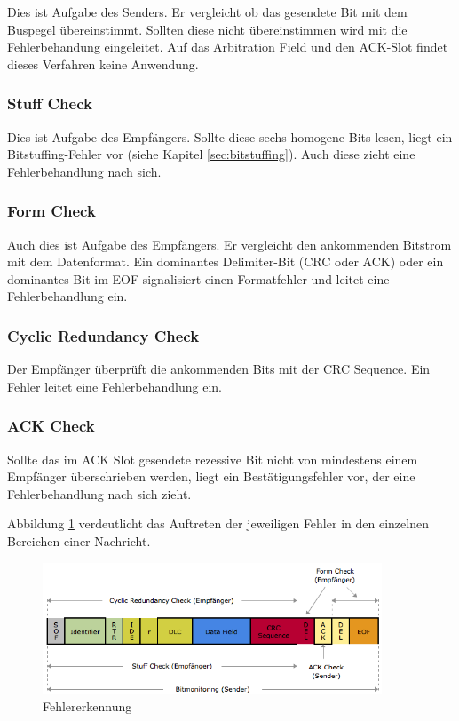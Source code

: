 Dies ist Aufgabe des Senders. Er vergleicht ob das gesendete Bit mit dem Buspegel übereinstimmt. 
Sollten diese nicht übereinstimmen wird mit die Fehlerbehandung eingeleitet. Auf das Arbitration Field 
und den ACK-Slot findet dieses Verfahren keine Anwendung.

\subsubsection{Stuff Check}

Dies ist Aufgabe des Empfängers. Sollte diese sechs homogene Bits lesen, liegt ein Bitstuffing-Fehler 
vor (siehe Kapitel \ref{sec:bitstuffing}). Auch diese zieht eine Fehlerbehandlung nach sich.

\subsubsection{Form Check}

Auch dies ist Aufgabe des Empfängers. Er vergleicht den ankommenden Bitstrom mit dem Datenformat.
Ein dominantes Delimiter-Bit (CRC oder ACK) oder ein dominantes Bit im EOF signalisiert einen 
Formatfehler und leitet eine Fehlerbehandlung ein.

\subsubsection{Cyclic Redundancy Check}

Der Empfänger überprüft die ankommenden Bits mit der CRC Sequence. Ein Fehler leitet eine 
Fehlerbehandlung ein.

\subsubsection{ACK Check}
	
Sollte das im ACK Slot gesendete rezessive Bit nicht von mindestens einem Empfänger überschrieben 
werden, liegt ein Bestätigungsfehler vor, der eine Fehlerbehandlung nach sich zieht.

Abbildung \ref{pic:errcheck} verdeutlicht das Auftreten der jeweiligen Fehler in den einzelnen Bereichen
einer Nachricht.

\begin{figure}[h] 
\centering
\includegraphics[width=0.9\textwidth]{figures/errcheck}
\caption{Fehlererkennung \citep{VEC}} 
\label{pic:errcheck}
\end{figure} 

